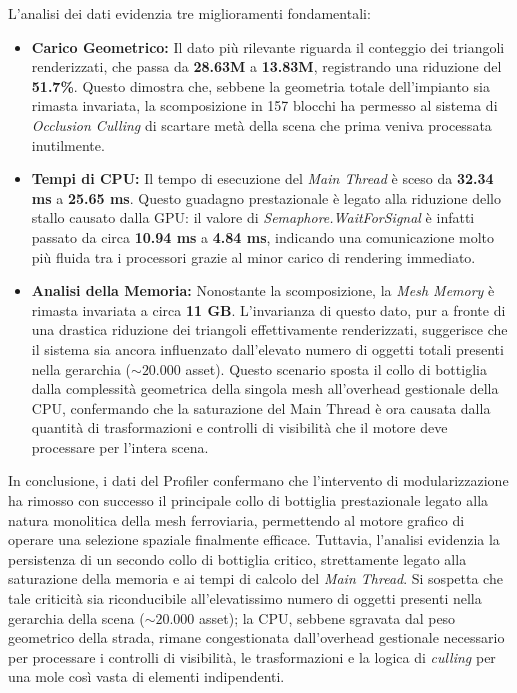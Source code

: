 L'analisi dei dati evidenzia tre miglioramenti fondamentali:

\begin{itemize}
    \item \textbf{Carico Geometrico:} Il dato più rilevante riguarda il conteggio dei triangoli renderizzati, che passa da \textbf{28.63M} a \textbf{13.83M}, registrando una riduzione del \textbf{51.7\%}. Questo dimostra che, sebbene la geometria totale dell'impianto sia rimasta invariata, la scomposizione in 157 blocchi ha permesso al sistema di \textit{Occlusion Culling} di scartare metà della scena che prima veniva processata inutilmente.
    
    \item \textbf{Tempi di CPU:} Il tempo di esecuzione del \textit{Main Thread} è sceso da \textbf{32.34 ms} a \textbf{25.65 ms}. Questo guadagno prestazionale è legato alla riduzione dello stallo causato dalla GPU: il valore di \textit{Semaphore.WaitForSignal} è infatti passato da circa \textbf{10.94 ms} a \textbf{4.84 ms}, indicando una comunicazione molto più fluida tra i processori grazie al minor carico di rendering immediato.
    
    \item \textbf{Analisi della Memoria:} Nonostante la scomposizione, la \textit{Mesh Memory} è rimasta invariata a circa \textbf{11 GB}. L'invarianza di questo dato, pur a fronte di una drastica riduzione dei triangoli effettivamente renderizzati, suggerisce che il sistema sia ancora influenzato dall'elevato numero di oggetti totali presenti nella gerarchia ($\sim 20.000$ asset). Questo scenario sposta il collo di bottiglia dalla complessità geometrica della singola mesh all'overhead gestionale della CPU, confermando che la saturazione del Main Thread è ora causata dalla quantità di trasformazioni e controlli di visibilità che il motore deve processare per l'intera scena.
\end{itemize}

In conclusione, i dati del Profiler confermano che l'intervento di modularizzazione ha rimosso con successo il principale collo di bottiglia prestazionale legato alla natura monolitica della mesh ferroviaria, permettendo al motore grafico di operare una selezione spaziale finalmente efficace. Tuttavia, l'analisi evidenzia la persistenza di un secondo collo di bottiglia critico, strettamente legato alla saturazione della memoria e ai tempi di calcolo del \textit{Main Thread}. Si sospetta che tale criticità sia riconducibile all'elevatissimo numero di oggetti presenti nella gerarchia della scena ($\sim 20.000$ asset); la CPU, sebbene sgravata dal peso geometrico della strada, rimane congestionata dall'overhead gestionale necessario per processare i controlli di visibilità, le trasformazioni e la logica di \textit{culling} per una mole così vasta di elementi indipendenti.

